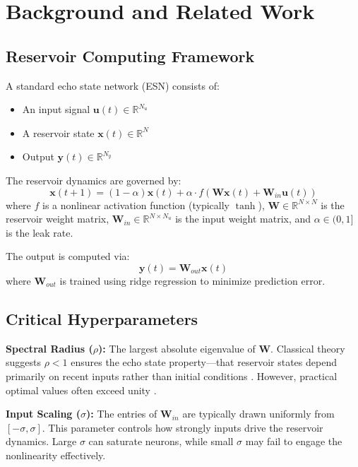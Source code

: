 \documentclass[11pt]{article}
\begin{document}
\section{Background and Related Work}

\subsection{Reservoir Computing Framework}

A standard echo state network (ESN) \cite{jaeger2001echo} consists of:
\begin{itemize}
    \item An input signal $\mathbf{u}(t) \in \mathbb{R}^{N_u}$
    \item A reservoir state $\mathbf{x}(t) \in \mathbb{R}^{N}$
    \item Output $\mathbf{y}(t) \in \mathbb{R}^{N_y}$
\end{itemize}

The reservoir dynamics are governed by:
\begin{equation}
    \mathbf{x}(t+1) = (1-\alpha)\mathbf{x}(t) + \alpha \cdot f(\mathbf{W}\mathbf{x}(t) + \mathbf{W}_{in}\mathbf{u}(t))
\end{equation}
where $f$ is a nonlinear activation function (typically $\tanh$), $\mathbf{W} \in \mathbb{R}^{N \times N}$ is the reservoir weight matrix, $\mathbf{W}_{in} \in \mathbb{R}^{N \times N_u}$ is the input weight matrix, and $\alpha \in (0,1]$ is the leak rate.

The output is computed via:
\begin{equation}
    \mathbf{y}(t) = \mathbf{W}_{out}\mathbf{x}(t)
\end{equation}
where $\mathbf{W}_{out}$ is trained using ridge regression to minimize prediction error.

\subsection{Critical Hyperparameters}

\textbf{Spectral Radius ($\rho$):} The largest absolute eigenvalue of $\mathbf{W}$. Classical theory suggests $\rho < 1$ ensures the echo state property—that reservoir states depend primarily on recent inputs rather than initial conditions \cite{jaeger2001echo}. However, practical optimal values often exceed unity \cite{hart2022exploring}.

\textbf{Input Scaling ($\sigma$):} The entries of $\mathbf{W}_{in}$ are typically drawn uniformly from $[-\sigma, \sigma]$. This parameter controls how strongly inputs drive the reservoir dynamics. Large $\sigma$ can saturate neurons, while small $\sigma$ may fail to engage the nonlinearity effectively.
\end{document}
